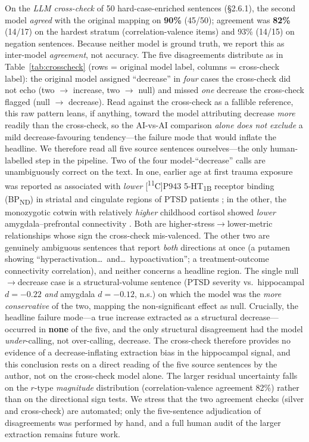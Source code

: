 \documentclass[11pt]{article}
\begin{document}
On the \emph{LLM cross-check} of 50 hard-case-enriched sentences (\S2.6.1), the
second model \emph{agreed} with the original mapping on \textbf{90\%} (45/50);
agreement was \textbf{82\%} (14/17) on the hardest stratum (correlation-valence
items) and 93\% (14/15) on negation sentences. Because neither model is ground
truth, we report this as inter-model \emph{agreement}, not accuracy. The five
disagreements distribute as in Table~\ref{tab:crosscheck} (rows = original model
label, columns = cross-check label): the original model assigned ``decrease'' in
\emph{four} cases the cross-check did not echo (two $\to$ increase, two $\to$
null) and missed \emph{one} decrease the cross-check flagged (null $\to$
decrease). Read against the cross-check as a fallible reference, this raw pattern
leans, if anything, toward the model attributing decrease \emph{more} readily
than the cross-check, so the AI-vs-AI comparison \emph{alone does not exclude} a
mild decrease-favouring tendency---the failure mode that would inflate the
headline. We therefore read all five source sentences ourselves---the only
human-labelled step in the pipeline. Two of the four model-``decrease'' calls are
unambiguously correct on the text. In one, earlier age at first trauma exposure
was reported as associated with \emph{lower} [\textsuperscript{11}C]P943
5-HT\textsubscript{1B} receptor binding (BP\textsubscript{ND}) in striatal and
cingulate regions of PTSD patients \cite{murrough2011}; in the other, the
monozygotic cotwin with relatively \emph{higher} childhood cortisol showed
\emph{lower} amygdala--prefrontal connectivity \cite{burghy2016}. Both are
higher-stress$\to$lower-metric relationships whose sign the cross-check
mis-valenced. The other two are genuinely
ambiguous sentences that report \emph{both} directions at once (a putamen showing
``hyperactivation\dots\ and\dots\ hypoactivation''; a treatment-outcome
connectivity correlation), and neither concerns a headline region. The single
null$\to$decrease case is a structural-volume sentence (PTSD severity vs.\
hippocampal $d=-0.22$ \emph{and} amygdala $d=-0.12$, n.s.) on which the model was
the \emph{more conservative} of the two, mapping the non-significant effect as
null. Crucially, the headline failure mode---a true increase extracted as a
structural decrease---occurred in \textbf{none} of the five, and the only
structural disagreement had the model \emph{under}-calling, not over-calling,
decrease. The cross-check therefore provides no evidence of a decrease-inflating
extraction bias in the hippocampal signal, and this conclusion rests on a direct
reading of the five source sentences by the author, not on the cross-check model
alone. The larger residual uncertainty falls on the $r$-type
\emph{magnitude} distribution (correlation-valence agreement 82\%) rather than on
the directional sign tests. We stress that the two agreement checks (silver and
cross-check) are automated; only the five-sentence adjudication of disagreements
was performed by hand, and a full human audit of the larger extraction remains
future work.
\end{document}
